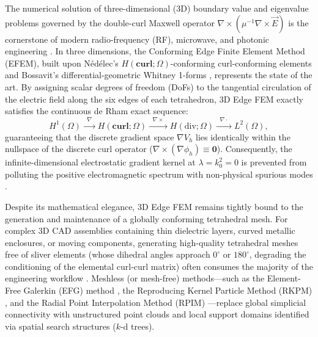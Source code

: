 \documentclass[preprint,12pt]{elsarticle}
\newcommand{\curl}{\nabla \times}
\newcommand{\divg}{\nabla \cdot}
\newcommand{\grad}{\nabla}
\newcommand{\Hcurl}{H(\mathbf{curl};\Omega)}
\newcommand{\Hdiv}{H(\text{div};\Omega)}
\begin{document}
The numerical solution of three-dimensional (3D) boundary value and eigenvalue problems governed by the double-curl Maxwell operator $\curl(\mu^{-1}\curl\vec{E})$ is the cornerstone of modern radio-frequency (RF), microwave, and photonic engineering \cite{Jin2014, Monk2003, Bossavit1998}. In three dimensions, the Conforming Edge Finite Element Method (EFEM), built upon N\'{e}d\'{e}lec's $\Hcurl$-conforming curl-conforming elements \cite{Nedelec1980, Nedelec1986} and Bossavit's differential-geometric Whitney 1-forms \cite{Bossavit1988, Hiptmair2002}, represents the state of the art. By assigning scalar degrees of freedom (DoFs) to the tangential circulation of the electric field along the six edges of each tetrahedron, 3D Edge FEM exactly satisfies the continuous de Rham exact sequence:
\begin{equation}
    H^1(\Omega) \xrightarrow{\;\;\grad\;\;} \Hcurl \xrightarrow{\;\;\curl\;\;} \Hdiv \xrightarrow{\;\;\divg\;\;} L^2(\Omega),
    \label{eq:derham_3d}
\end{equation}
guaranteeing that the discrete gradient space $\grad V_h$ lies identically within the nullspace of the discrete curl operator ($\curl(\grad\phi_h) \equiv \mathbf{0}$). Consequently, the infinite-dimensional electrostatic gradient kernel at $\lambda = k_0^2 = 0$ is prevented from polluting the positive electromagnetic spectrum with non-physical spurious modes \cite{Sun1995, Boffi2010}.

Despite its mathematical elegance, 3D Edge FEM remains tightly bound to the generation and maintenance of a globally conforming tetrahedral mesh. For complex 3D CAD assemblies containing thin dielectric layers, curved metallic enclosures, or moving components, generating high-quality tetrahedral meshes free of sliver elements (whose dihedral angles approach $0^\circ$ or $180^\circ$, degrading the conditioning of the elemental curl-curl matrix) often consumes the majority of the engineering workflow \cite{Belytschko1996, Nguyen2008}. Meshless (or mesh-free) methods---such as the Element-Free Galerkin (EFG) method \cite{Belytschko1994}, the Reproducing Kernel Particle Method (RKPM) \cite{Liu1995}, and the Radial Point Interpolation Method (RPIM) \cite{Liu2005, Kaufmann2010}---replace global simplicial connectivity with unstructured point clouds and local support domains identified via spatial search structures ($k$-d trees).
\end{document}
